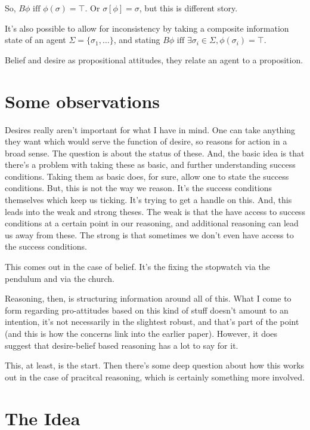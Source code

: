 \documentclass[10pt]{article}
\begin{document}
So, \(B\phi \text{ iff } \phi(\sigma) = \top\).
Or \(\sigma[\phi] = \sigma\), but this is different story.

It's also possible to allow for inconsistency by taking a composite information state of an agent \(\Sigma = \{\sigma_{1}, \dots\}\), and stating \(B\phi \text{ iff } \exists \sigma_{i} \in \Sigma, \phi(\sigma_{i}) = \top\).





Belief and desire as propositional attitudes, they relate an agent to a proposition.


\section{Some observations}
\label{sec:some-observations}

Desires really aren't important for what I have in mind.
One can take anything they want which would serve the function of desire, so reasons for action in a broad sense.
The question is about the status of these.
And, the basic idea is that there's a problem with taking these as basic, and further understanding success conditions.
Taking them as basic does, for sure, allow one to state the success conditions.
But, this is not the way we reason.
It's the success conditions themselves which keep us ticking.
It's trying to get a handle on this.
And, this leads into the weak and strong theses.
The weak is that the have access to success conditions at a certain point in our reasoning, and additional reasoning can lead us away from these.
The strong is that sometimes we don't even have access to the success conditions.

This comes out in the case of belief.
It's the fixing the stopwatch via the pendulum and via the church.

Reasoning, then, is structuring information around all of this.
What I come to form regarding pro-attitudes based on this kind of stuff doesn't amount to an intention, it's not necessarily in the slightest robust, and that's part of the point (and this is how the concerns link into the earlier paper).
However, it does suggest that desire-belief based reasoning has a lot to say for it.

This, at least, is the start.
Then there's some deep question about how this works out in the case of pracitcal reasoning, which is certainly something more involved.

\section{The Idea}
\label{sec:idea}
\end{document}
